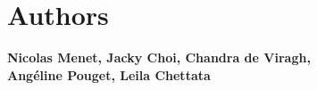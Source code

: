 \columnbreak
\vspace*{\fill}
\section*{Authors}
\textbf{Nicolas Menet, Jacky Choi, Chandra de Viragh,\\ Angéline Pouget, Leila Chettata}